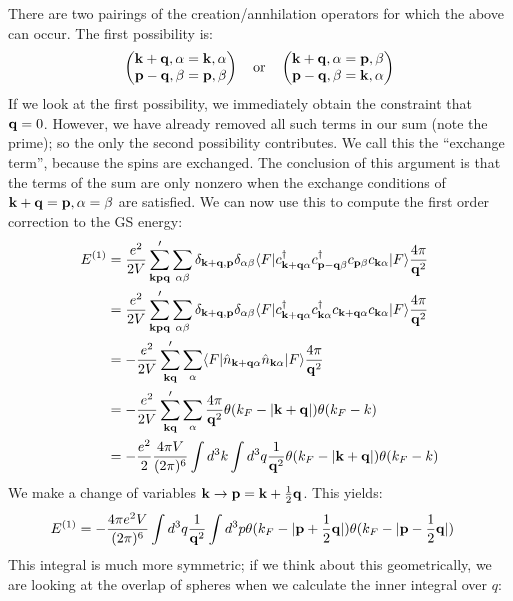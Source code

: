 There are two pairings of the creation/annhilation operators for which the above can occur.  The first possibility is:
\begin{equation}
    \begin{pmatrix}\mathbf{k} + \mathbf{q}, \alpha = \mathbf{k}, \alpha
    \\ \mathbf{p} - \mathbf{q}, \beta = \mathbf{p}, \beta\end{pmatrix} \quad \text{or} \quad \begin{pmatrix}\mathbf{k} + \mathbf{q}, \alpha = \mathbf{p}, \beta
    \\ \mathbf{p} - \mathbf{q}, \beta = \mathbf{k}, \alpha\end{pmatrix}
\end{equation}
If we look at the first possibility, we immediately obtain the constraint that $\mathbf{q} = 0$. However, we have already removed all such terms in our sum (note the prime); so the only the second possibility contributes. We call this the ``exchange term'', because the spins are exchanged. The conclusion of this argument is that the terms of the sum are only nonzero when the exchange conditions of $\mathbf{k} + \mathbf{q} = \mathbf{p}, \alpha = \beta$ are satisfied. We can now use this to compute the first order correction to the GS energy:
\begin{equation}
    \begin{split}
        E^{(1)} &= \frac{e^2}{2V}\sum_{\mathbf{k}\mathbf{p}\mathbf{q}}'\sum_{\alpha\beta} \delta_{\mathbf{k} + \mathbf{q}, \mathbf{p}}\delta_{\alpha\beta} \langle F \rvert c^\dagger_{\mathbf{k} + \mathbf{q}\alpha}c^{\dagger}_{\mathbf{p} - \mathbf{q}\beta}c_{\mathbf{p}\beta}c_{\mathbf{k}\alpha}\lvert F \rangle\frac{4\pi}{\mathbf{q}^2}
        \\ &= \frac{e^2}{2V}\sum_{\mathbf{k}\mathbf{p}\mathbf{q}}'\sum_{\alpha\beta} \delta_{\mathbf{k} + \mathbf{q}, \mathbf{p}}\delta_{\alpha\beta} \langle F \rvert c^\dagger_{\mathbf{k} + \mathbf{q}\alpha}c^{\dagger}_{\mathbf{k}\alpha}c_{\mathbf{k} + \mathbf{q}\alpha}c_{\mathbf{k}\alpha}\lvert F \rangle\frac{4\pi}{\mathbf{q}^2}
        \\ &= -\frac{e^2}{2V}\sum'_{\mathbf{k}\mathbf{q}}
        \sum_\alpha\langle F \rvert\hat{n}_{\mathbf{k} + \mathbf{q} \alpha}\hat{n}_{\mathbf{k}\alpha}\lvert F \rangle\frac{4\pi}{\mathbf{q}^2}
        \\ &= -\frac{e^2}{2V}\sum_{\mathbf{k}\mathbf{q}}'\sum_\alpha \frac{4\pi}{\mathbf{q}^2}\theta(k_F - \lvert \mathbf{k} + \mathbf{q} \rvert)\theta(k_F - k)
        \\ &= -\frac{e^2}{2}\frac{4\pi V}{(2\pi)^6}\int d^3k \int d^3q\frac{1}{\mathbf{q}^2} \theta(k_F - \lvert \mathbf{k} + \mathbf{q} \rvert)\theta(k_F - k)
    \end{split}
\end{equation}
We make a change of variables $\mathbf{k} \to \mathbf{p} = \mathbf{k} + \frac{1}{2}\mathbf{q}$. This yields:
\begin{equation}
    \begin{split}
        E^{(1)} &= -\frac{4\pi e^2V}{(2\pi)^6}\int d^3 q \frac{1}{\mathbf{q}^2}\int d^3p \theta(k_F - \lvert \mathbf{p} + \frac{1}{2}\mathbf{q} \rvert)\theta(k_F - \lvert \mathbf{p} - \frac{1}{2}\mathbf{q} \rvert)
    \end{split}
\end{equation}
This integral is much more symmetric; if we think about this geometrically, we are looking at the overlap of spheres when we calculate the inner integral over $q$:


